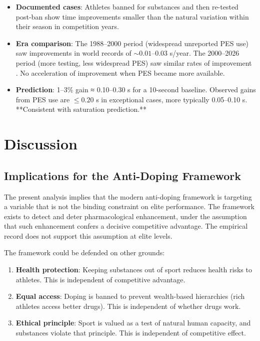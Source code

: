 \documentclass[11pt,twocolumn]{article}
\theoremstyle{definition}
\theoremstyle{remark}
\begin{document}
\begin{itemize}[leftmargin=1.2em]
\item \textbf{Documented cases}: Athletes banned for substances and then re-tested post-ban show time improvements smaller than the natural variation within their season in competition years.

\item \textbf{Era comparison}: The 1988--2000 period (widespread unreported PES use) saw improvements in world records of $\sim 0.01$--$0.03$ s/year. The 2000--2026 period (more testing, less widespread PES) saw similar rates of improvement \cite{bolt2008}. No acceleration of improvement when PES became more available.

\item \textbf{Prediction}: 1--3\% gain ≈ 0.10--0.30 s for a 10-second baseline. Observed gains from PES use are $\le 0.20$ s in exceptional cases, more typically 0.05--0.10 s. **Consistent with saturation prediction.**
\end{itemize}

\section{Discussion}
\label{sec:discussion}

\subsection{Implications for the Anti-Doping Framework}

The present analysis implies that the modern anti-doping framework is targeting a variable that is not the binding constraint on elite performance. The framework exists to detect and deter pharmacological enhancement, under the assumption that such enhancement confers a decisive competitive advantage. The empirical record does not support this assumption at elite levels.

The framework could be defended on other grounds:
\begin{enumerate}[leftmargin=1.2em]
\item \textbf{Health protection}: Keeping substances out of sport reduces health risks to athletes. This is independent of competitive advantage.

\item \textbf{Equal access}: Doping is banned to prevent wealth-based hierarchies (rich athletes access better drugs). This is independent of whether drugs work.

\item \textbf{Ethical principle}: Sport is valued as a test of natural human capacity, and substances violate that principle. This is independent of competitive effect.
\end{enumerate}
\end{document}
